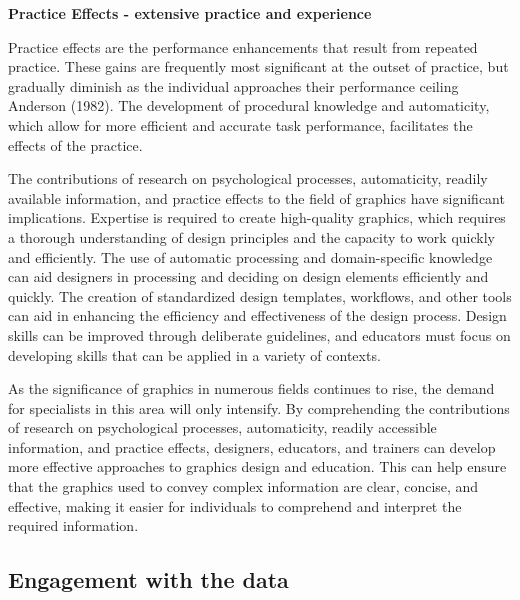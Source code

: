 \documentclass[print]{nuthesis}
\begin{document}
\textbf{Practice Effects - extensive practice and experience}

Practice effects are the performance enhancements that result from repeated practice.
These gains are frequently most significant at the outset of practice, but gradually diminish as the individual approaches their performance ceiling Anderson (1982).
The development of procedural knowledge and automaticity, which allow for more efficient and accurate task performance, facilitates the effects of the practice.

The contributions of research on psychological processes, automaticity, readily available information, and practice effects to the field of graphics have significant implications.
Expertise is required to create high-quality graphics, which requires a thorough understanding of design principles and the capacity to work quickly and efficiently.
The use of automatic processing and domain-specific knowledge can aid designers in processing and deciding on design elements efficiently and quickly.
The creation of standardized design templates, workflows, and other tools can aid in enhancing the efficiency and effectiveness of the design process.
Design skills can be improved through deliberate guidelines, and educators must focus on developing skills that can be applied in a variety of contexts.

As the significance of graphics in numerous fields continues to rise, the demand for specialists in this area will only intensify.
By comprehending the contributions of research on psychological processes, automaticity, readily accessible information, and practice effects, designers, educators, and trainers can develop more effective approaches to graphics design and education.
This can help ensure that the graphics used to convey complex information are clear, concise, and effective, making it easier for individuals to comprehend and interpret the required information.

\hypertarget{engagement-with-the-data}{%
\subsection{Engagement with the data}\label{engagement-with-the-data}}

\end{document}
